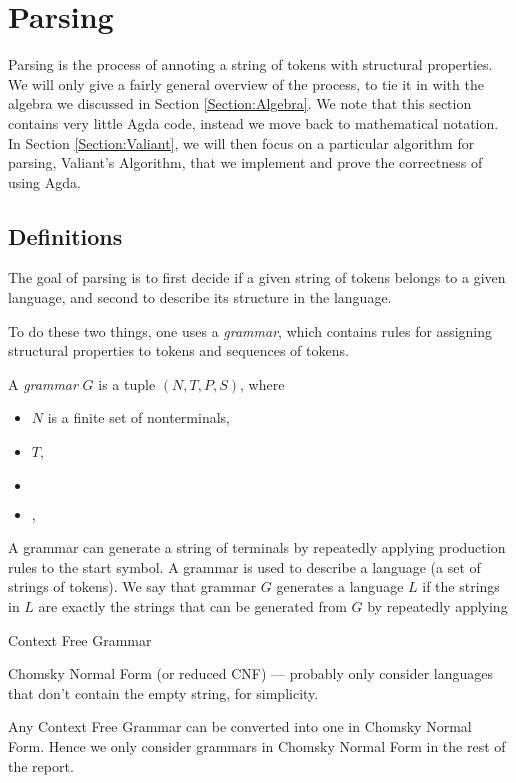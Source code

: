 \newcommand{\productions}{P}
\newcommand{\nonterminals}{N}
\newcommand{\terminals}{T}
\newcommand{\startsymbol}{S}
\newcommand{\grammar}{(\nonterminals, \terminals, \productions, \startsymbol)}
\section{Parsing}
Parsing is the process of annoting a string of tokens with structural properties. We will only give a fairly general overview of the process, to tie it in with the algebra we discussed in Section \ref{Section:Algebra}. We note that this section contains  very little Agda code, instead we move back to mathematical notation. In Section \ref{Section:Valiant}, we will then focus on a particular algorithm for parsing, Valiant's Algorithm, that we implement and prove the correctness of using Agda.


\subsection{Definitions}
The goal of parsing is to first decide if a given string of tokens belongs to a given language, and second to describe its structure in the language.

To do these two things, one uses a \emph{grammar}, which contains rules for assigning structural properties to tokens and sequences of tokens.

\begin{Definition}
  A \emph{grammar} $G$ is a tuple $\grammar$, where 
  \begin{itemize}
  \item $\nonterminals$ is a finite set of nonterminals, 
  \item $\terminals$,
  \item $ $
  \item $ $,
  \end{itemize}
\end{Definition}
A grammar can generate a string of terminals by repeatedly applying production rules to the start symbol. 
A grammar is used to describe a language (a set of strings of tokens). We say that  grammar $G$ generates a language $L$ if the strings in $L$ are exactly the strings that can be generated from $G$ by repeatedly applying 

\begin{Definition}
  Context Free Grammar
\end{Definition}
\begin{Definition}
  Chomsky Normal Form (or reduced CNF) --- probably only consider languages that don't contain the empty string, for simplicity.
\end{Definition}
Any Context Free Grammar can be converted into one in Chomsky Normal Form. Hence we only consider grammars in Chomsky Normal Form in the rest of the report.

